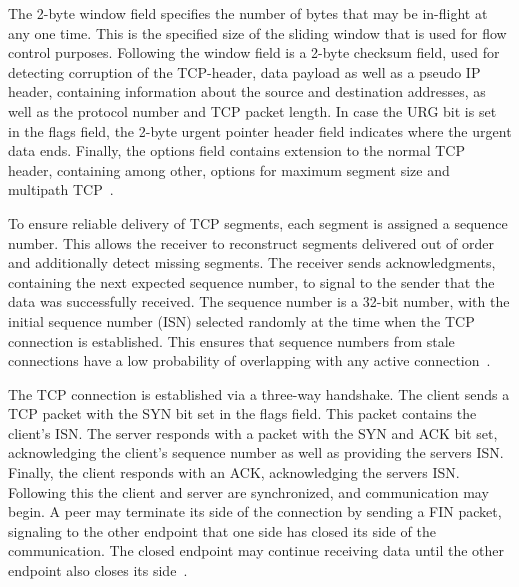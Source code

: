 \documentclass[english, 12pt, a4paper, elec, utf8, a-2b, online]{aaltothesis}
\begin{document}
The 2-byte window field specifies the number of bytes that may be in-flight at any one
time. This is the specified size of the sliding window that is used for flow
control purposes. Following the window field is a 2-byte checksum field, used for
detecting corruption of the TCP-header, data payload as well as a pseudo IP header,
containing information about the source and destination addresses, as well as the
protocol number and TCP packet length. In case the URG bit is set in the flags field,
the 2-byte urgent pointer header field indicates where the urgent data ends. Finally,
the options field contains extension to the normal TCP header, containing among other, options
for maximum segment size and multipath TCP~\cite{rfc8684}.

To ensure reliable delivery of TCP segments, each segment is assigned a sequence number.
This allows the receiver to reconstruct segments delivered out of order and additionally
detect missing segments. The receiver sends acknowledgments, containing the next expected
sequence number, to signal to the sender that the data was successfully received.
The sequence number is a 32-bit number, with the initial sequence number (ISN)
selected randomly at the time when the TCP connection is established. This ensures that
sequence numbers from stale connections have a low probability of overlapping with
any active connection~\cite{rfc793}.

The TCP connection is established via a three-way handshake. The client sends
a TCP packet with the SYN bit set in the flags field. This packet contains the
client's ISN. The server responds with a packet with the SYN and ACK bit set,
acknowledging the client's sequence number as well as providing the servers ISN.
Finally, the client responds with an ACK, acknowledging the servers ISN. Following
this the client and server are synchronized, and communication may begin. A peer
may terminate its side of the connection by sending a FIN packet, signaling to
the other endpoint that one side has closed its side of the communication. The
closed endpoint may continue receiving data until the other endpoint also closes
its side~\cite{rfc793}.
\end{document}
